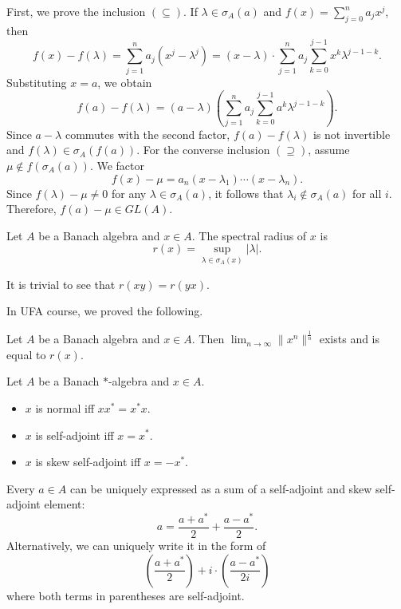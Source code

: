 \begin{myproof}
  First, we prove the inclusion $(\subseteq)$.
  If $\lambda \in \sigma_A (a)$ and $f(x) = \sum_{j = 0} ^n a_j x^j$, then 
  $$f(x) - f(\lambda) = \sum_{j = 1} ^n a_j (x^j - \lambda^j) = (x - \lambda) \cdot \sum_{j = 1} ^n a_j \sum_{k = 0} ^{j -1} x^k \lambda^{j - 1 - k}.$$
  Substituting $x = a$, we obtain
  $$f(a) - f(\lambda) = (a - \lambda) \left(\sum_{j = 1} ^n a_j \sum_{k = 0} ^{j - 1} a^k \lambda^{j - 1 - k} \right).$$
  Since $a - \lambda$ commutes with the second factor, $f(a) - f(\lambda)$
  is not invertible and $f(\lambda) \in \sigma_A (f(a))$.
  For the converse inclusion $(\supseteq)$, assume $\mu \notin f(\sigma_A (a))$. We factor 
  $$f(x) - \mu = a_n (x - \lambda_1) \cdots (x - \lambda_n).$$
  Since $f(\lambda) - \mu \neq 0$ for any $\lambda \in \sigma_A (a)$, it follows that $\lambda_i \notin \sigma_A (a)$ for all $i$.
  Therefore, $f(a) - \mu \in GL(A)$.
\end{myproof}

\begin{definition}
  Let $A$ be a Banach algebra and $x \in A$. The spectral radius of $x$ is 
  $$r(x) = \sup_{\lambda \in \sigma_A (x)} |\lambda|.$$
\end{definition}

\begin{remark}
  It is trivial to see that $r(xy) = r(yx)$.
\end{remark}

In UFA course, we proved the following.

\begin{theorem}
  Let $A$ be a Banach algebra and $x \in A$. Then $\lim_{n \to \infty} \|x^n\|^{\frac{1}{n}}$ exists 
  and is equal to $r(x)$.
\end{theorem}

\begin{definition}
  Let $A$ be a Banach $*$-algebra and $x \in A$.
  \begin{itemize}
    \item $x$ is normal iff $x x^* = x^* x$.
    \item $x$ is self-adjoint iff $x = x^*$.
    \item $x$ is skew self-adjoint iff $x = - x^*$.
  \end{itemize}
\end{definition}

\begin{remark}
  Every $a \in A$ can be uniquely expressed as a sum of a self-adjoint and skew self-adjoint element:
  $$a = \frac{a + a^*}{2} + \frac{a - a^*}{2}.$$
  Alternatively, we can uniquely write it in the form of
  $$\left(\frac{a + a^*}{2} \right) + i \cdot \left(\frac{a - a^*}{2i}\right)$$
  where both terms in parentheses are self-adjoint.
\end{remark}

